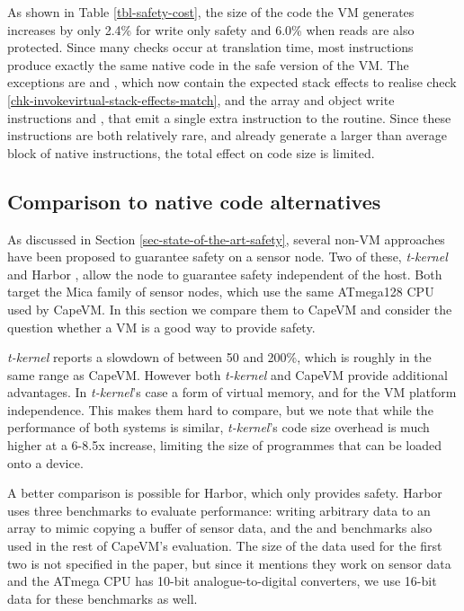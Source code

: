 As shown in Table \ref{tbl-safety-cost}, the size of the code the VM generates increases by only 2.4\% for write only safety and 6.0\% when reads are also protected. Since many checks occur at translation time, most instructions produce exactly the same native code in the safe version of the VM. The exceptions are  and , which now contain the expected stack effects to realise check \ref{chk-invokevirtual-stack-effects-match}, and the array and object write instructions  and , that emit a single extra  instruction to the  routine. Since these instructions are both relatively rare, and already generate a larger than average block of native instructions, the total effect on code size is limited.

\subsection{Comparison to native code alternatives}
As discussed in Section \ref{sec-state-of-the-art-safety}, several non-VM approaches have been proposed to guarantee safety on a sensor node. Two of these, \emph{t-kernel} \cite{Gu:2006ww} and Harbor \cite{Kumar:2007ge}, allow the node to guarantee safety independent of the host. Both target the Mica family of sensor nodes, which use the same ATmega128 CPU used by CapeVM. In this section we compare them to CapeVM and consider the question whether a VM is a good way to provide safety.

\emph{t-kernel} reports a slowdown of between 50 and 200\%, which is roughly in the same range as CapeVM. However both \emph{t-kernel} and CapeVM provide additional advantages. In \emph{t-kernel}'s case a form of virtual memory, and for the VM platform independence. This makes them hard to compare, but we note that while the performance of both systems is similar, \emph{t-kernel}'s code size overhead is much higher at a 6-8.5x increase, limiting the size of programmes that can be loaded onto a device.

A better comparison is possible for Harbor, which only provides safety. Harbor uses three benchmarks to evaluate performance: writing arbitrary data to an array to mimic copying a buffer of sensor data, and the  and  benchmarks also used in the rest of CapeVM's evaluation. The size of the data used for the first two is not specified in the paper, but since it mentions they work on sensor data and the ATmega CPU has 10-bit analogue-to-digital converters, we use 16-bit data for these benchmarks as well.

